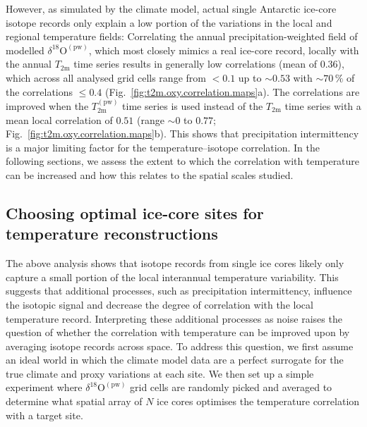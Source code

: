 \documentclass[cp, manuscript]{copernicus}
\begin{document}
However, as simulated by the climate model, actual single Antarctic ice-core
isotope records only explain a low portion of the variations in the local and
regional temperature fields: Correlating the annual precipitation-weighted field
of modelled $\delta^{18}\mathrm{O}^{\mathrm{(pw)}}$, which most closely mimics a
real ice-core record, locally with the annual $T_{2\mathrm{m}}$ time series
results in generally low correlations (mean of $0.36$), which across all
analysed grid cells range from $<0.1$ up to $\sim0.53$ with $\sim70\,\%$ of the
correlations $\leq0.4$ (Fig.~\ref{fig:t2m.oxy.correlation.maps}a). The
correlations are improved when the $T_{2\mathrm{m}}^{\mathrm{(pw)}}$ time series
is used instead of the $T_{2\mathrm{m}}$ time series with a mean local
correlation of $0.51$ (range $\sim0$ to $0.77$;
Fig.~\ref{fig:t2m.oxy.correlation.maps}b). This shows that precipitation
intermittency is a major limiting factor for the temperature--isotope
correlation. In the following sections, we assess the extent to which the
correlation with temperature can be increased and how this relates to the
spatial scales studied.

\subsection{Choosing optimal ice-core sites for temperature reconstructions}
\label{results:picking}

The above analysis shows that isotope records from single ice cores likely only
capture a small portion of the local interannual temperature variability. This
suggests that additional processes, such as precipitation intermittency,
influence the isotopic signal and decrease the degree of correlation with the
local temperature record. Interpreting these additional processes as noise
raises the question of whether the correlation with temperature can be improved
upon by averaging isotope records across space. To address this question, we
first assume an ideal world in which the climate model data are a perfect
surrogate for the true climate and proxy variations at each site. We then set up
a simple experiment where $\delta^{18}\mathrm{O}^{\mathrm{(pw)}}$ grid cells are
randomly picked and averaged to determine what spatial array of $N$ ice cores
optimises the temperature correlation with a target site.
\end{document}
